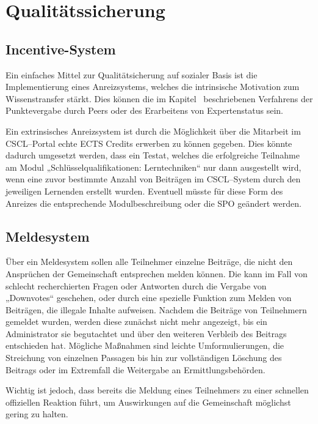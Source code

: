 
\section{Qualitätssicherung} %
\label{sec:qualitatssicherung}

\subsection{Incentive-System} %
\label{sub:incentive_system}
Ein einfaches Mittel zur Qualitätsicherung auf sozialer Basis ist die Implementierung eines Anreizsystems, welches die intrinsische Motivation zum Wissenstransfer stärkt. Dies können die im Kapitel~ beschriebenen Verfahrens der Punktevergabe durch Peers oder des Erarbeitens von Expertenstatus sein.

Ein extrinsisches Anreizsystem ist durch die Möglichkeit über die Mitarbeit im \ac{CSCL}–Portal echte \ac{ECTS} Credits erwerben zu können gegeben. Dies könnte dadurch umgesetzt werden, dass ein Testat, welches die erfolgreiche Teilnahme am Modul „Schlüsselqualifikationen: Lerntechniken“ nur dann ausgestellt wird, wenn eine zuvor bestimmte Anzahl von Beiträgen im \ac{CSCL}–System durch den jeweiligen Lernenden erstellt wurden. Eventuell müsste für diese Form des Anreizes die entsprechende Modulbeschreibung oder die \ac{SPO} geändert werden.

\subsection{Meldesystem} %
\label{sub:meldesystem}
Über ein Meldesystem sollen alle Teilnehmer einzelne Beiträge, die nicht den Ansprüchen der Gemeinschaft entsprechen melden können. Die kann im Fall von schlecht recherchierten Fragen oder Antworten durch die Vergabe von „Downvotes“ geschehen, oder durch eine spezielle Funktion zum Melden von Beiträgen, die illegale Inhalte aufweisen. Nachdem die Beiträge von Teilnehmern gemeldet wurden, werden diese zunächst nicht mehr angezeigt, bis ein Administrator sie begutachtet und über den weiteren Verbleib des Beitrags entschieden hat. Mögliche Maßnahmen sind leichte Umformulierungen, die Streichung von einzelnen Passagen bis hin zur vollständigen Löschung des Beitrags oder im Extremfall die Weitergabe an Ermittlungsbehörden.

Wichtig ist jedoch, dass bereits die Meldung eines Teilnehmers zu einer schnellen offiziellen Reaktion führt, um Auswirkungen auf die Gemeinschaft möglichst gering zu halten.

